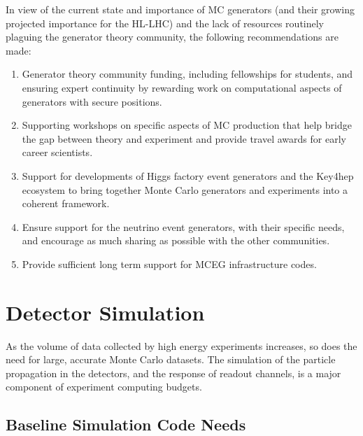 \documentclass[10pt,a4paper]{article}
\begin{document}
In view of the current state and importance of MC generators (and their
growing projected importance for the HL-LHC) and the lack of resources
routinely plaguing the generator theory community, the following
recommendations are made:

\begin{enumerate}
\def\labelenumi{\arabic{enumi}.}
\item
  Generator theory community funding, including fellowships for students, and
  ensuring expert continuity by rewarding work on computational aspects of
  generators with secure positions.
\item
  Supporting workshops on specific aspects of MC production that help bridge the
  gap between theory and experiment and provide travel awards for early career
  scientists.
\item
  Support for developments of Higgs factory event generators and the
  Key4hep ecosystem to bring together Monte Carlo generators and
  experiments into a coherent framework.
\item
  Ensure support for the neutrino event generators, with their specific
  needs, and encourage as much sharing as possible with the other
  communities.
\item 
  Provide sufficient long term support for MCEG infrastructure codes.
\end{enumerate}

\section{Detector Simulation}\label{detector-simulation}

As the volume of data collected by high energy experiments increases, so
does the need for large, accurate Monte Carlo datasets. The simulation
of the particle propagation in the detectors, and the response of readout
channels, is a major component of experiment computing budgets.

\subsection{Baseline Simulation Code
Needs}\label{baseline-simulation-code-needs}
\end{document}
